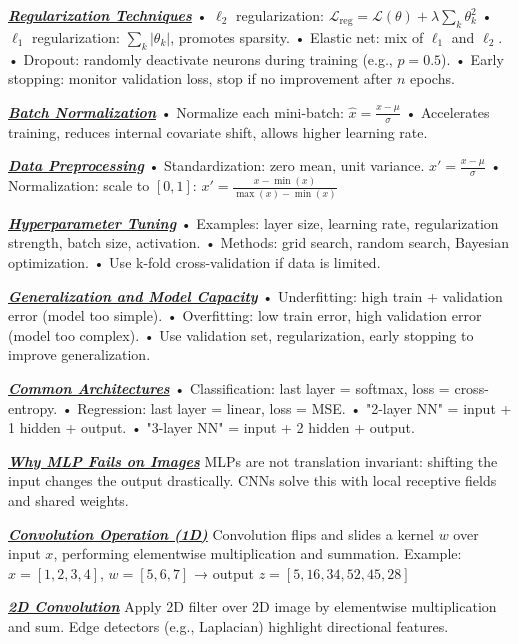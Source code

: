 \documentclass[10pt]{article}
\newcommand{\bulletPoint}[1]{\ul{\textit{\textbf{#1}}}}
\begin{document}
\begin{multicols*}{2}
\bulletPoint{Regularization Techniques} \quad
• $\ell_2$ regularization: $\mathcal{L}_{\text{reg}} = \mathcal{L}(\theta) + \lambda \sum_k \theta_k^2$ \quad
• $\ell_1$ regularization: $\sum_k |\theta_k|$, promotes sparsity. \quad
• Elastic net: mix of $\ell_1$ and $\ell_2$. \quad
• Dropout: randomly deactivate neurons during training (e.g., $p=0.5$). \quad
• Early stopping: monitor validation loss, stop if no improvement after $n$ epochs.

\bulletPoint{Batch Normalization} \quad
• Normalize each mini-batch: $\hat{x} = \frac{x - \mu}{\sigma}$ \quad
• Accelerates training, reduces internal covariate shift, allows higher learning rate.

\bulletPoint{Data Preprocessing} \quad
• Standardization: zero mean, unit variance. \quad
$x' = \frac{x - \mu}{\sigma}$ \quad
• Normalization: scale to $[0, 1]$: $x' = \frac{x - \min(x)}{\max(x) - \min(x)}$

\bulletPoint{Hyperparameter Tuning} \quad
• Examples: layer size, learning rate, regularization strength, batch size, activation. \quad
• Methods: grid search, random search, Bayesian optimization. \quad
• Use k-fold cross-validation if data is limited.

\bulletPoint{Generalization and Model Capacity} \quad
• Underfitting: high train + validation error (model too simple). \quad
• Overfitting: low train error, high validation error (model too complex). \quad
• Use validation set, regularization, early stopping to improve generalization.

\bulletPoint{Common Architectures} \quad
• Classification: last layer = softmax, loss = cross-entropy. \quad
• Regression: last layer = linear, loss = MSE. \quad
• "2-layer NN" = input + 1 hidden + output. \quad
• "3-layer NN" = input + 2 hidden + output.


\bulletPoint{Why MLP Fails on Images} \quad
MLPs are not translation invariant: shifting the input changes the output drastically. CNNs solve this with local receptive fields and shared weights.

\bulletPoint{Convolution Operation (1D)} \quad
Convolution flips and slides a kernel $w$ over input $x$, performing elementwise multiplication and summation. \quad
Example: $x = [1, 2, 3, 4]$, $w = [5, 6, 7]$ → output $z = [5, 16, 34, 52, 45, 28]$

\bulletPoint{2D Convolution} \quad
Apply 2D filter over 2D image by elementwise multiplication and sum. Edge detectors (e.g., Laplacian) highlight directional features.


\end{multicols*}
\end{document}
